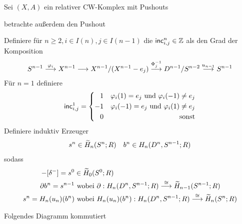 \Def{}
Sei $(X,A)$ ein relativer CW-Komplex mit Pushouts
\begin{center}
\end{center}
betrachte außerdem den Pushout
\begin{center}
\end{center}
Definiere für $n \geq 2, i \in I(n), j\in I(n-1)$ die  $\textsf{inc}^{n}_{i,j} \in \mathbb{Z}$ als den Grad der Komposition
\begin{align*}
S^{n-1} \overset{\varphi_i}{\longrightarrow} X^{n-1} \overset{}{\longrightarrow} X^{n-1}/(X^{n-1} - e_j) \overset{\Phi_j^{-1}}{\longrightarrow} D^{n-1}/S^{n-2} \overset{u_{n-1}}{\longrightarrow} S^{n-1}
\end{align*}
Für $n = 1$ definiere
\begin{align*}
\textsf{inc}^{1}_{i,j} = \left\lbrace
\begin{aligned}
1 && \varphi_i(1) = e_j \text{ und } \varphi_i(-1) \neq e_j\\
-1 && \varphi_i(-1) = e_j \text{ und } \varphi_i(1) \neq e_j\\
0 && \text{ sonst}
\end{aligned}
\right.
\end{align*}
Definiere induktiv Erzeuger
\begin{align*}
s^n \in \widetilde{H}_n(S^n;R) && b^n \in H_n(D^n, S^{n-1}; R) 
\end{align*}
sodass
\begin{align*}
	[\delta^+] - [\delta^-] = s^0 & \in \H_0(S^0;R)                                                                 \\
	\d b^n = s^{n-1}              & \text{ wobei } \d : H_n(D^n, S^{n-1};R)\Pfeil{\cong} \H_{n-1}(S^{n-1};R)        \\
	s^n = H_n(u_n)(b^n)           & \text{ wobei } H_n(u_n)(b^n) : H_n(D^n, S^{n-1};R)\Pfeil{\cong} \H_{n}(S^{n};R)
\end{align*}

\Satz{}
Folgendes Diagramm kommutiert

\begin{center}
\end{center}

